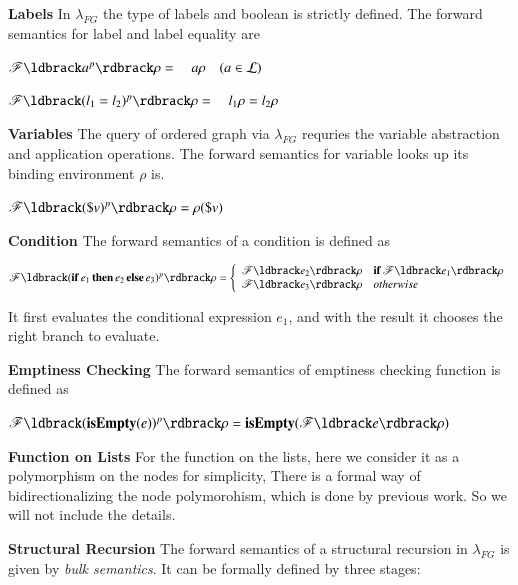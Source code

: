 \documentclass{llncs}
\begin{document}
\textbf{Labels} In $\lambda_{FG}$ the type of labels and boolean is strictly defined. The forward semantics for label and label equality are

$\mathscr{F}\ldbrack a^p\rdbrack\rho=\quad a\rho\quad(a\in\mathcal{L})$

$\mathscr{F}\ldbrack (l_1=l_2)^p\rdbrack\rho=\quad l_1\rho=l_2\rho$

\textbf{Variables} The query of ordered graph via $\lambda_{FG}$ requries the variable abstraction and application operations. The forward semantics for variable looks up its binding environment $\rho$ is.

$\mathscr{F}\ldbrack(\$v)^p\rdbrack\rho=\rho(\$v)$

\textbf{Condition} The forward semantics of a condition is defined as

$\mathscr{F}\ldbrack (\mathbf{if}\,e_1\,\mathbf{then}\,e_2\,\mathbf{else}\,e_3)^p\rdbrack\rho=\left\{
    \begin{array}{ll}
     \mathscr{F}\ldbrack e_2\rdbrack\rho& \mathbf{if}\,\mathscr{F}\ldbrack e_1\rdbrack\rho\\
     \mathscr{F}\ldbrack e_3\rdbrack\rho& otherwise
    \end{array}
    \right.$

It first evaluates the conditional expression $e_1$, and with the result it chooses the right branch to evaluate.

\textbf{Emptiness Checking} The forward semantics of emptiness checking function is defined as

$\mathscr{F}\ldbrack(\mathbf{isEmpty}(e))^p\rdbrack\rho=\mathbf{isEmpty}(\mathscr{F}\ldbrack e\rdbrack\rho)$

\textbf{Function on Lists} For the function on the lists, here we consider it as a polymorphism on the nodes for simplicity, There is a formal way of bidirectionalizing the node polymorohism, which is done by previous work. So we will not include the details.

\textbf{Structural Recursion} The forward semantics of a structural recursion in $\lambda_{FG}$ is given by \emph{bulk semantics}. It can be formally defined by three stages:
\end{document}
